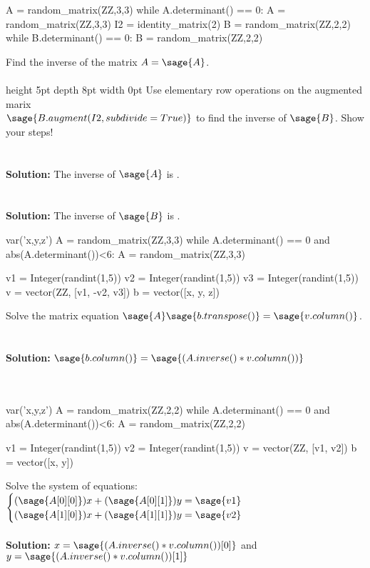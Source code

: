 \documentclass{ximera}
\def\mystrut(#1,#2){\vrule height #1pt depth #2pt width 0pt}
\begin{document}
\begin{sagesilent}
A = random_matrix(ZZ,3,3)
while A.determinant() == 0:
    A = random_matrix(ZZ,3,3)
I2 = identity_matrix(2)
B = random_matrix(ZZ,2,2)
while B.determinant() == 0:
    B = random_matrix(ZZ,2,2)
\end{sagesilent}
\noindent Find the inverse of the matrix $A=\sage{A}$.\\\\
\noindent \mystrut(5,8) Use elementary row operations on the augmented
marix\\$\sage{B.augment(I2,subdivide=True)}$ to find the inverse of $\sage{B}$.
Show your steps!\\\\\\
{\bf Solution:} The inverse of   $\sage{A}$ is .\\\\\\
{\bf Solution:} The inverse of   $\sage{B}$ is  .


\begin{sagesilent}
var('x,y,z')
A = random_matrix(ZZ,3,3)
while A.determinant() == 0 and abs(A.determinant())<6:
    A = random_matrix(ZZ,3,3)

v1 = Integer(randint(1,5))
v2 = Integer(randint(1,5))
v3 = Integer(randint(1,5))
v = vector(ZZ, [v1, -v2, v3])
b = vector([x, y, z])
\end{sagesilent}
\noindent Solve the matrix equation $\sage{A}\sage{b.transpose()}=\sage{v.column()}$.\\\\\\
{\bf Solution:} $\sage{b.column()}=\sage{(A.inverse()*v.column())}$\\\\\\
\begin{sagesilent}
var('x,y,z')
A = random_matrix(ZZ,2,2)
while A.determinant() == 0 and abs(A.determinant())<6:
    A = random_matrix(ZZ,2,2)

v1 = Integer(randint(1,5))
v2 = Integer(randint(1,5))
v = vector(ZZ, [v1, v2])
b = vector([x, y])
\end{sagesilent}
\noindent Solve the system of equations:
$\begin{cases}
(\sage{A[0][0]})x+(\sage{A[0][1]})y=\sage{v1}\\
(\sage{A[1][0]})x+(\sage{A[1][1]})y=\sage{v2}\\
\end{cases}$\\\\
\vspace{.25in}
{\bf Solution:} $x=\sage{(A.inverse()*v.column())[0]}$ and
$y=\sage{(A.inverse()*v.column())[1]}$
\end{document}
